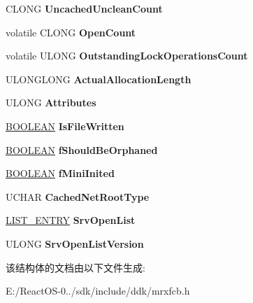 \begin{DoxyCompactItemize}
C\+L\+O\+NG {\bfseries Uncached\+Unclean\+Count}
\item 
\mbox{\label{struct___m_r_x___f_c_b___a72880452e436324a3813361f6a976926}} 
volatile C\+L\+O\+NG {\bfseries Open\+Count}
\item 
\mbox{\label{struct___m_r_x___f_c_b___a69986ed3e9caf8245b47ccc363e199fd}} 
volatile U\+L\+O\+NG {\bfseries Outstanding\+Lock\+Operations\+Count}
\item 
\mbox{\label{struct___m_r_x___f_c_b___ab55ae56f4d5570696b733bb17be75d00}} 
U\+L\+O\+N\+G\+L\+O\+NG {\bfseries Actual\+Allocation\+Length}
\item 
\mbox{\label{struct___m_r_x___f_c_b___a0fdb70c9a2b596e62735e6562d2cb289}} 
U\+L\+O\+NG {\bfseries Attributes}
\item 
\mbox{\label{struct___m_r_x___f_c_b___af7dd897bc93b324d218e7d2369f02eee}} 
\hyperlink{_processor_bind_8h_a112e3146cb38b6ee95e64d85842e380a}{B\+O\+O\+L\+E\+AN} {\bfseries Is\+File\+Written}
\item 
\mbox{\label{struct___m_r_x___f_c_b___abfd77d13e86b24bfa673f0f78e1624f7}} 
\hyperlink{_processor_bind_8h_a112e3146cb38b6ee95e64d85842e380a}{B\+O\+O\+L\+E\+AN} {\bfseries f\+Should\+Be\+Orphaned}
\item 
\mbox{\label{struct___m_r_x___f_c_b___a56466fee93f17b9c3290c779247f607e}} 
\hyperlink{_processor_bind_8h_a112e3146cb38b6ee95e64d85842e380a}{B\+O\+O\+L\+E\+AN} {\bfseries f\+Mini\+Inited}
\item 
\mbox{\label{struct___m_r_x___f_c_b___af20353f85f31399f984b77385cefdb4c}} 
U\+C\+H\+AR {\bfseries Cached\+Net\+Root\+Type}
\item 
\mbox{\label{struct___m_r_x___f_c_b___a2da39bec4db7312075e51ac5dd4d14d1}} 
\hyperlink{struct___l_i_s_t___e_n_t_r_y}{L\+I\+S\+T\+\_\+\+E\+N\+T\+RY} {\bfseries Srv\+Open\+List}
\item 
\mbox{\label{struct___m_r_x___f_c_b___a64fc4a8a0f3a071fa6ee56600a772251}} 
U\+L\+O\+NG {\bfseries Srv\+Open\+List\+Version}
\end{DoxyCompactItemize}


该结构体的文档由以下文件生成\+:\begin{DoxyCompactItemize}
\item 
E\+:/\+React\+O\+S-\/0../sdk/include/ddk/mrxfcb.\+h\end{DoxyCompactItemize}
